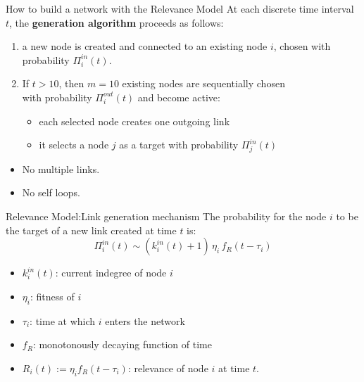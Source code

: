 \begin{frame}{How to build a network with the Relevance Model}
    At each discrete time interval $t$, the \textbf{generation algorithm} proceeds as follows:
    \begin{enumerate}
        \item a \alert{new node} is created and connected to an existing node $i$, chosen with probability $\Pi_i^{in}(t)$.
        \item If $t>10$, then $m=10$ existing nodes are sequentially chosen \\ with probability $\Pi_i^{out}(t)$ and become \alert{active}:
        \begin{itemize}
            \item each selected node creates one outgoing link
            \item it selects a node $j$ as a target with probability $\Pi_j^{in}(t)$
        \end{itemize}
    \end{enumerate}
    \vspace{1em}
    \begin{footnotesize}
    \begin{itemize}
        \item No multiple links.
        \item No self loops.
    \end{itemize}
    \end{footnotesize}
\end{frame}

\begin{frame}{Relevance Model:\@ Link generation mechanism}
    The probability for the node $i$ to be the target of a new link created at time $t$ is:
    \[
        \Pi_i^{in}(t) \sim (k_i^{in}(t) + 1) \, \eta_i \, f_R (t-\tau_i)
    \]
    \begin{itemize}
        \item $k_i^{in}(t)$: current indegree of node $i$
        \item $\eta_i$: fitness of $i$
        \item $\tau_i$: time at which $i$ enters the network
        \item $f_R$: monotonously decaying function of time
        \item $R_i(t) := \eta_i f_R (t-\tau_i)$: \alert{relevance} of node $i$ at time $t$.
    \end{itemize}
\end{frame}

